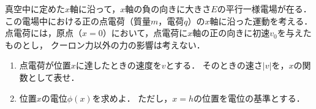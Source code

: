 \documentclass[../../../all/physics-standard_questions_all.tex]{subfiles}
\begin{document}
真空中に定めた$x$軸に沿って，$x$軸の負の向きに大きさ$E$の平行一様電場が在る．
この電場中における正の点電荷（質量$m$，電荷$q$）の$x$軸に沿った運動を考える．
点電荷には，原点（$x=0$）において，点電荷に$x$軸の正の向きに初速$v_0$を与えたものとし，
クーロン力以外の力の影響は考えない．

\begin{enumerate}

    \item 点電荷が位置$x$に達したときの速度を$v$とする．
    そのときの速さ$|v|$を，$x$の関数として表せ．

    \item 位置$x$の電位$\phi(x)$を求めよ．
    ただし，$x=h$の位置を電位の基準とする．

\end{enumerate}
\end{document}
